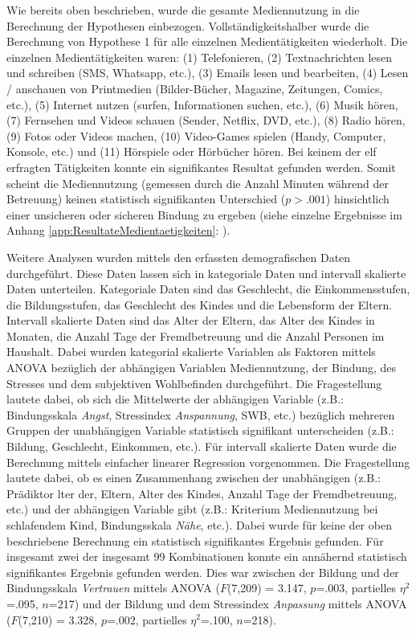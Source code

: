 Wie bereits oben beschrieben, wurde die gesamte Mediennutzung in die Berechnung der Hypothesen einbezogen. Vollständigkeitshalber wurde die Berechnung von Hypothese 1 für alle einzelnen Medientätigkeiten wiederholt. Die einzelnen Medientätigkeiten waren: (1) Telefonieren,  (2) Textnachrichten lesen und schreiben (SMS, Whatsapp, etc.), (3) Emails lesen und bearbeiten, (4) Lesen / anschauen von Printmedien (Bilder-Bücher, Magazine, Zeitungen, Comics, etc.), (5) Internet nutzen (surfen, Informationen suchen, etc.), (6) Musik hören, (7) Fernsehen und Videos schauen (Sender, Netflix, DVD, etc.), (8) Radio hören, (9) Fotos oder Videos machen, (10) Video-Games spielen (Handy, Computer, Konsole, etc.) und (11) Hörspiele oder Hörbücher hören. Bei keinem der elf erfragten Tätigkeiten konnte ein signifikantes Resultat gefunden werden. Somit scheint die Mediennutzung (gemessen durch die Anzahl Minuten während der Betreuung) keinen statistisch signifikanten Unterschied ($p>.001$) hinsichtlich einer unsicheren oder sicheren Bindung zu ergeben (siehe einzelne Ergebnisse im Anhang \ref{app:ResultateMedientaetigkeiten}: \textit{}).

Weitere Analysen wurden mittels den erfassten demografischen Daten durchgeführt. Diese Daten lassen sich in kategoriale Daten und intervall skalierte Daten unterteilen. Kategoriale Daten sind das Geschlecht, die Einkommensstufen, die Bildungsstufen, das Geschlecht des Kindes und die Lebensform der Eltern. Intervall skalierte Daten sind das Alter der Eltern, das Alter des Kindes in Monaten, die Anzahl Tage der Fremdbetreuung und die Anzahl Personen im Haushalt. Dabei wurden kategorial skalierte Variablen als Faktoren mittels ANOVA bezüglich der abhängigen Variablen Mediennutzung, der Bindung, des Stresses und dem subjektiven Wohlbefinden durchgeführt. Die Fragestellung lautete dabei, ob sich die Mittelwerte der abhängigen Variable (z.B.: Bindungsskala \textit{Angst}, Stressindex \textit{Anspannung}, SWB, etc.) bezüglich mehreren Gruppen der unabhängigen Variable statistisch signifikant unterscheiden  (z.B.: Bildung, Geschlecht, Einkommen, etc.). Für intervall skalierte Daten wurde die Berechnung mittels einfacher linearer Regression vorgenommen. Die Fragestellung lautete dabei, ob es einen Zusammenhang zwischen der unabhängigen (z.B.: Prädiktor lter der, Eltern, Alter des Kindes, Anzahl Tage der Fremdbetreuung, etc.) und der abhängigen Variable gibt (z.B.: Kriterium Mediennutzung bei schlafendem Kind, Bindungsskala \textit{Nähe}, etc.). Dabei wurde für keine der oben beschriebene Berechnung ein statistisch signifikantes Ergebnis gefunden. Für insgesamt zwei der insgesamt 99 Kombinationen konnte ein annähernd statistisch signifikantes Ergebnis gefunden werden. Dies war zwischen der Bildung und der Bindungsskala \textit{Vertrauen} mittels ANOVA ($F$(7,209) = 3.147, $p$=.003, partielles $\eta^2$=.095, $n$=217) und der Bildung und dem Stressindex \textit{Anpassung} mittels ANOVA ($F$(7,210) = 3.328, $p$=.002, partielles $\eta^2$=.100, $n$=218).





